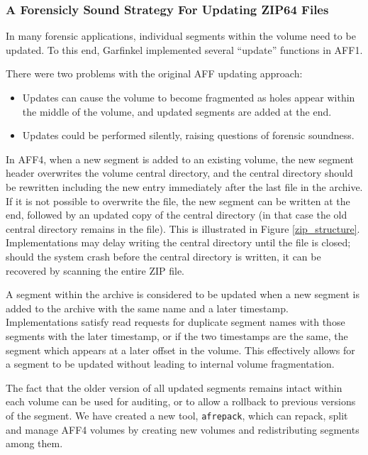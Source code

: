 \documentclass[10pt, conference]{IEEEtran}
\begin{document}
\subsubsection{A Forensicly Sound Strategy For Updating ZIP64 Files}

In many forensic applications, individual segments within the volume
need to be updated. To this end, Garfinkel implemented several
``update'' functions in AFF1\cite{garfinkel:aff}. 

There were two problems with the original AFF updating approach:
\begin{itemize}
\item Updates can cause the volume to
become fragmented as holes appear within the middle of the volume, and
updated segments are added at the end.
\item Updates could be performed silently, raising questions of
  forensic soundness.
\end{itemize}

In AFF4, when a new segment is added to an existing volume, the new
segment header overwrites the volume central directory, and the
central directory should be rewritten including the new entry
immediately after the last file in the archive. If it is not possible
to overwrite the file, the new segment can be written at the end,
followed by an updated copy of the central directory (in that case the
old central directory remains in the file). This is illustrated in
Figure \ref{zip_structure}. Implementations may delay
writing the central directory until the file is closed; should the
system crash before the central directory is written, it can be
recovered by scanning the entire ZIP file.

A segment within the archive is considered to be updated when a new
segment is added to the archive with the same name and a later
timestamp. Implementations satisfy read requests for duplicate
segment names with those segments with the later timestamp, or if the
two timestamps are the same, the segment which appears at a later
offset in the volume. This effectively allows for a segment to be
updated without leading to internal volume fragmentation.

The fact that the older version of all updated segments remains intact
within each volume can be used for auditing, or to allow a rollback to
previous versions of the segment. We have created a new tool,
\texttt{afrepack}, which can repack, split and manage AFF4 volumes by
creating new volumes and redistributing segments among them.
\end{document}
